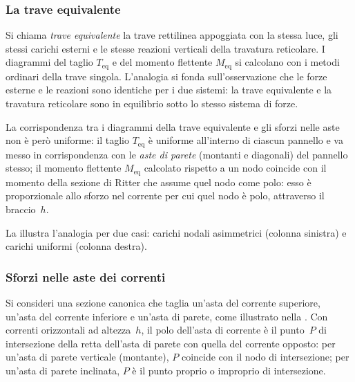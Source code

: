 \subsubsection{La trave equivalente}
\label{subsec:trave_equiv_def}

Si chiama \emph{trave equivalente} la trave rettilinea
appoggiata con la stessa luce, gli stessi carichi
esterni e le stesse reazioni verticali della travatura
reticolare. I diagrammi del taglio $T_\text{eq}$
e del momento flettente $M_\text{eq}$ si calcolano
con i metodi ordinari della trave singola.
L'analogia si fonda sull'osservazione che le forze
esterne e le reazioni sono identiche per i due sistemi:
la trave equivalente e la travatura reticolare sono
in equilibrio sotto lo stesso sistema di forze.

La corrispondenza tra i diagrammi della trave
equivalente e gli sforzi nelle aste non è però
uniforme: il taglio $T_\text{eq}$ è uniforme
all'interno di ciascun pannello e va messo in
corrispondenza con le \emph{aste di parete}
(montanti e diagonali) del pannello stesso;
il momento flettente $M_\text{eq}$ calcolato
rispetto a un nodo coincide con il momento
della sezione di Ritter che assume quel nodo
come polo: esso è proporzionale allo sforzo
nel corrente per cui quel nodo è polo,
attraverso il braccio~$h$.

La  illustra l'analogia
per due casi: carichi nodali asimmetrici (colonna
sinistra) e carichi uniformi (colonna destra).






\subsubsection{Sforzi nelle aste dei correnti}
\label{subsec:sforzi_correnti}

Si consideri una sezione canonica che taglia un'asta
del corrente superiore, un'asta del corrente inferiore
e un'asta di parete, come illustrato nella
. Con correnti orizzontali
ad altezza~$h$, il polo dell'asta di corrente è il
punto~$P$ di intersezione della retta dell'asta di
parete con quella del corrente opposto: per un'asta
di parete verticale (montante), $P$ coincide con il
nodo di intersezione; per un'asta di parete inclinata,
$P$ è il punto proprio o improprio di intersezione.

